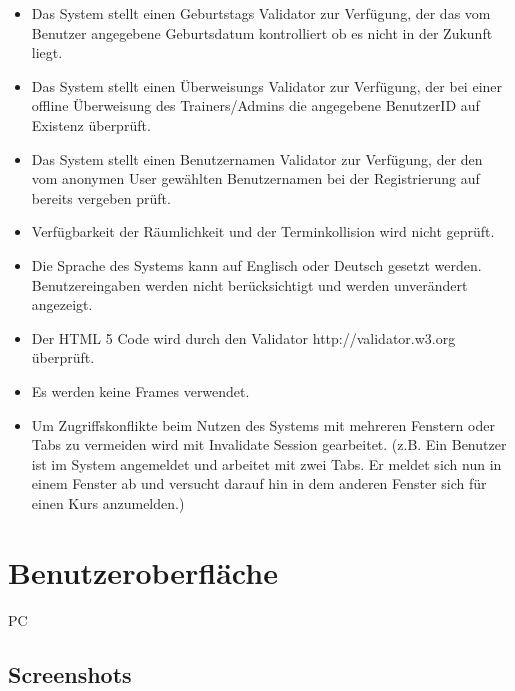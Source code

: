 \documentclass[a4paper]{scrreprt}
\begin{document}
\begin{itemize}
	\item \Func{} Das System stellt einen Geburtstags Validator zur Verfügung, der das vom Benutzer angegebene Geburtsdatum kontrolliert ob es nicht in der Zukunft liegt. 
	\item \Func{} Das System stellt einen Überweisungs Validator zur Verfügung, der bei einer offline Überweisung des Trainers/Admins die angegebene BenutzerID auf Existenz überprüft.
	\item \Func{} Das System stellt einen Benutzernamen Validator zur Verfügung, der den vom anonymen User gewählten Benutzernamen bei der Registrierung auf bereits vergeben prüft.   
	\item \Func{} Verfügbarkeit der Räumlichkeit und der Terminkollision wird nicht geprüft.
	\item \Func{} Die Sprache des Systems kann auf Englisch oder Deutsch gesetzt werden. Benutzereingaben werden nicht berücksichtigt und werden unverändert angezeigt.
	\item \Func{} Der HTML 5 Code wird durch den Validator http://validator.w3.org überprüft.
	\item \Func{} Es werden keine Frames verwendet.
	\item \Func{} Um Zugriffskonflikte beim Nutzen des Systems mit mehreren Fenstern oder Tabs zu vermeiden wird mit Invalidate Session gearbeitet. (z.B. Ein Benutzer ist im System angemeldet und arbeitet mit zwei Tabs. Er meldet sich nun in einem Fenster ab und versucht darauf hin in dem anderen Fenster sich für einen Kurs anzumelden.)  
\end{itemize}

		
		
 
\chapter{Benutzeroberfläche}
	\begin{tiny}
		PC
	\end{tiny}
   
    \section{Screenshots}
    
	    \subsection{}
    
	    \subsection{}
    
\end{document}

